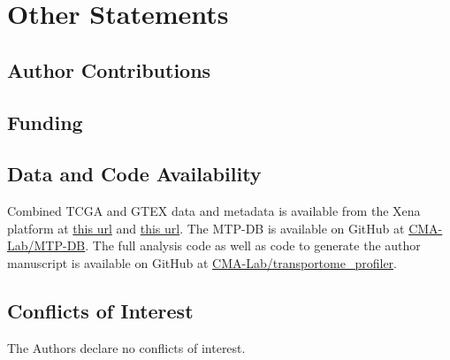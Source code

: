 \section{Other Statements}

\subsection{Author Contributions}

\subsection{Funding}

\subsection{Data and Code Availability}
Combined TCGA and GTEX data and metadata is available from the Xena platform at
\href{https://toil-xena-hub.s3.us-east-1.amazonaws.com/download/TcgaTargetGtex_gene_expected_count.gz }{this url} and \href{https://toil-xena-hub.s3.us-east-1.amazonaws.com/download/TcgaTargetGTEX_phenotype.txt.gz}{this url}.
The MTP-DB is available on GitHub at \href{https://github.com/CMA-Lab/MTP-DB}{CMA-Lab/MTP-DB}.
The full analysis code as well as  code to generate the author
manuscript is available on GitHub at \href{https://github.com/CMA-Lab/transportome_profiler}{CMA-Lab/transportome\_profiler}.

\subsection{Conflicts of Interest}
The Authors declare no conflicts of interest.